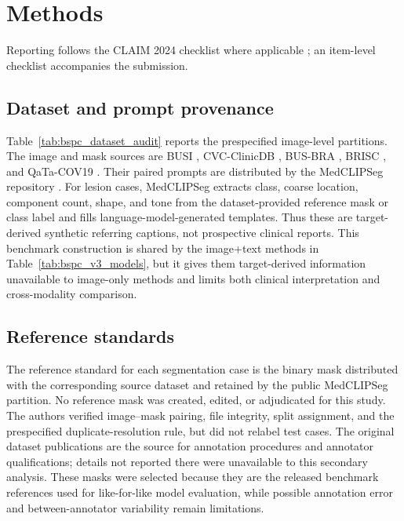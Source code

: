 \section{Methods}
\label{sec:protocol}
Reporting follows the CLAIM 2024 checklist where applicable \cite{claim2024};
an item-level checklist accompanies the submission.

\subsection{Dataset and prompt provenance}
Table~\ref{tab:bspc_dataset_audit} reports the prespecified image-level
partitions. The image and
mask sources are BUSI \cite{busi}, CVC-ClinicDB \cite{cvc}, BUS-BRA
\cite{busbra}, BRISC \cite{brisc}, and QaTa-COV19 \cite{qatacov19}. Their paired
prompts are distributed by the MedCLIPSeg repository \cite{medclipseg}. For
lesion cases, MedCLIPSeg extracts class, coarse location, component count, shape,
and tone from the dataset-provided reference mask or class label and fills language-model-generated
templates. Thus these are target-derived synthetic referring captions, not
prospective clinical reports. This benchmark construction is shared by the
image+text methods in Table~\ref{tab:bspc_v3_models}, but it gives them
target-derived information unavailable to image-only methods and limits both
clinical interpretation and cross-modality comparison.

\subsection{Reference standards}
The reference standard for each segmentation case is the binary mask distributed
with the corresponding source dataset and retained by the public MedCLIPSeg
partition. No reference mask was created, edited, or adjudicated for this study.
The authors verified image--mask pairing, file integrity, split assignment, and
the prespecified duplicate-resolution rule, but did not relabel test cases. The
original dataset publications are the source for annotation procedures and
annotator qualifications; details not reported there were unavailable to this
secondary analysis. These masks were selected because they are the released
benchmark references used for like-for-like model evaluation, while possible
annotation error and between-annotator variability remain limitations.

\def\BmcTableSelection{1}


